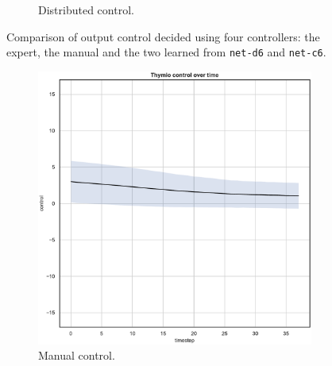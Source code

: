 \begin{figure}[!htb]
\begin{center}
\begin{subfigure}[h]{0.35\textwidth}
			\caption{Distributed control.}
		\end{subfigure}
	\end{center}
	\vspace{-0.5cm}
	\caption[Evaluation of the control decided by \texttt{net-c6}.]{Comparison of 
	output control decided using four controllers: the expert, the manual and the 
	two learned from \texttt{net-d6} and \texttt{net-c6}.}
\end{figure}

\medskip
\begin{figure}[!htb]\ContinuedFloat
	\begin{center}
		\begin{subfigure}[h]{0.35\textwidth}			
			\includegraphics[width=\textwidth]{contents/images/net-d6/control-overtime-manual}%
			\caption{Manual control.}
		\end{subfigure}
		\hspace{1cm}
		\begin{subfigure}[h]{0.35\textwidth}

\end{subfigure}
\end{center}
\end{figure}
